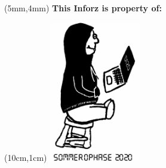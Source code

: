 \thispagestyle{empty}

\begin{textblock*}{10cm}(5mm,4mm)
\normalsize \textbf{This Inforz is property of:}
\end{textblock*}

\begin{textblock*}{4cm}(10cm,1cm)
\includegraphics[width=4cm]{../grafik/wesen/wesen_ophase}
\end{textblock*}
